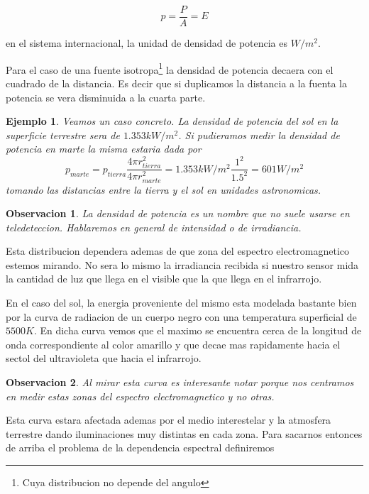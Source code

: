 \documentclass[a4paper,12pt]{article}
\newtheorem{exa}{Ejemplo}[section]
\newtheorem*{obs}{Observacion}
\begin{document}
\begin{equation}
  p = \frac{P}{A} = E
\end{equation}

en el sistema internacional, la unidad de densidad de potencia es $W/m^2$.

Para el caso de una fuente isotropa\footnote{Cuya distribucion no depende del
angulo} la densidad de potencia decaera con el cuadrado de la distancia. Es
decir que si duplicamos la distancia a la fuenta la potencia se vera disminuida
a la cuarta parte.

\begin{exa}
  Veamos un caso concreto. La densidad de potencia del sol en la superficie
  terrestre sera de $1.353 kW/m^2$. Si pudieramos medir la densidad de potencia
  en marte la misma estaria dada por
  $$ p_{marte} = p_{tierra} \frac{4\pi r_{tierra}^2}{4\pi r_{marte}^2}= 1.353
  kW/m^2 \frac{1^2}{1.5^2} = 601 W/m^2$$
  tomando las distancias entre la tierra y el sol en unidades astronomicas.
\end{exa}

\begin{obs}
  La densidad de potencia es un nombre que no suele usarse en teledeteccion.
  Hablaremos en general de intensidad o de \emph{irradiancia}.
\end{obs}

Esta distribucion dependera ademas de que zona del espectro electromagnetico
estemos mirando. No sera lo mismo la irradiancia recibida si nuestro sensor mida
la cantidad de luz que llega en el visible que la que llega en el infrarrojo.

En el caso del sol, la energia proveniente del mismo esta modelada bastante bien
por la curva de radiacion de un cuerpo negro con una temperatura superficial de
$5500 K$. En dicha curva vemos que el maximo se encuentra cerca de la longitud
de onda correspondiente al color amarillo y que decae mas rapidamente hacia el
sectol del ultravioleta que hacia el infrarrojo.

\begin{obs}
  Al mirar esta curva es interesante notar porque nos centramos en medir estas
  zonas del espectro electromagnetico y no otras.
\end{obs}

Esta curva estara afectada ademas por el medio interestelar y la atmosfera
terrestre dando iluminaciones muy distintas en cada zona. Para sacarnos entonces
de arriba el problema de la dependencia espectral definiremos
\end{document}

